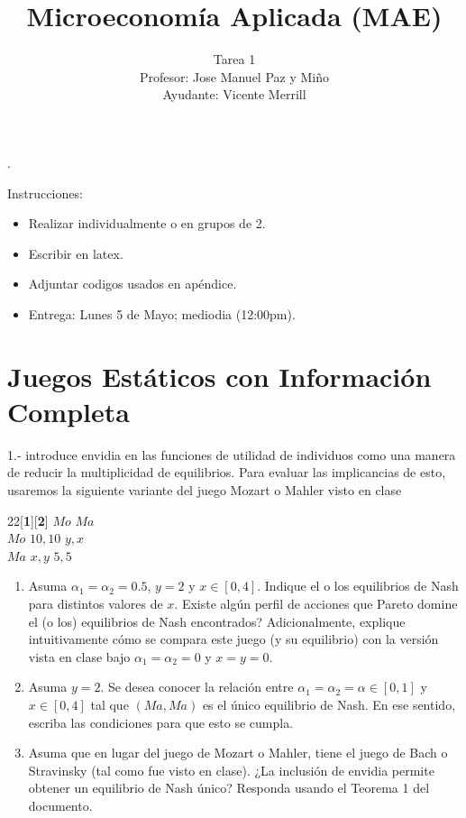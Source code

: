 \documentclass[11pt]{article}
\title{Microeconom\'ia Aplicada (MAE)}
\author{Tarea 1 \\ Profesor: Jose Manuel Paz y Mi\~no \\ Ayudante: Vicente Merrill}
\date{}
\newcommand{\blankline}{\quad\pagebreak[2]}
\begin{document}
\maketitle

\blankline

\setlength{\parindent}{0pt}.

Instrucciones:
\begin{itemize}
	\item Realizar individualmente o en grupos de 2.
	\item Escribir en latex.
	\item Adjuntar codigos usados en ap\'endice.
	\item Entrega: Lunes 5 de Mayo; mediodia (12:00pm).
\end{itemize}


\section*{Juegos Est\'aticos con Informaci\'on Completa}

1.- \cite{vignolo2005envy} introduce envidia en las funciones de utilidad de individuos como una manera de reducir la multiplicidad de equilibrios. Para evaluar las implicancias de esto, usaremos la siguiente variante del juego Mozart o Mahler visto en clase

\begin{center}
 \begin{game}{2}{2}[\textbf{1}][\textbf{2}]
                  \>$Mo$         \>$Ma$\\
        $Mo$       \>$10,10$       \>$y,x$\\
        $Ma$       \>$x,y$       \>$5,5$
\end{game}
\end{center}

\begin{enumerate}
	\item Asuma $\alpha_1 = \alpha_2 = 0.5$, $y=2$ y $x \in [0,4]$. Indique el o los equilibrios de Nash para distintos valores de $x$. Existe alg\'un perfil de acciones que Pareto domine el (o los) equilibrios de Nash encontrados? Adicionalmente, explique intuitivamente c\'omo se compara este juego (y su equilibrio) con la versi\'on vista en clase bajo $\alpha_1 = \alpha_2 = 0$ y $x=y=0$.

	\item Asuma $y=2$. Se desea conocer la relaci\'on entre $\alpha_{1} = \alpha_{2} = \alpha \in [0,1]$ y $x \in [0,4]$ tal que $(Ma,Ma)$ es el \'unico equilibrio de Nash. En ese sentido, escriba las condiciones para que esto se cumpla.

	\item Asuma que en lugar del juego de Mozart o Mahler, tiene el juego de Bach o Stravinsky (tal como fue visto en clase). ¿La inclusi\'on de envidia permite obtener un equilibrio de Nash \'unico? Responda usando el Teorema 1 del documento.
\end{enumerate}
\end{document}

